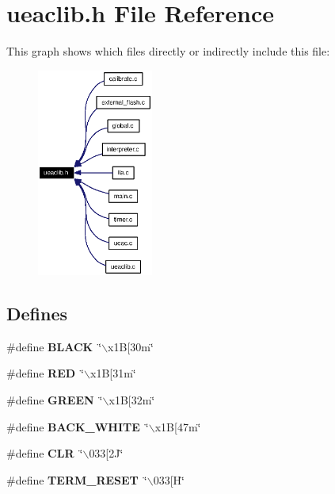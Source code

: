 \section{ueaclib.h File Reference}
\label{ueaclib_8h}


This graph shows which files directly or indirectly include this file:\begin{figure}[H]
\begin{center}
\leavevmode
\includegraphics[width=108pt]{ueaclib_8h__dep__incl}
\end{center}
\end{figure}
\subsection*{Defines}
\begin{CompactItemize}
\item 
\#define {\bf BLACK}~\char`\"{}$\backslash$x1B[30m\char`\"{}
\item 
\#define {\bf RED}~\char`\"{}$\backslash$x1B[31m\char`\"{}
\item 
\#define {\bf GREEN}~\char`\"{}$\backslash$x1B[32m\char`\"{}
\item 
\#define {\bf BACK\_\-WHITE}~\char`\"{}$\backslash$x1B[47m\char`\"{}
\item 
\#define {\bf CLR}~\char`\"{}$\backslash$033[2J\char`\"{}
\item 
\#define {\bf TERM\_\-RESET}~\char`\"{}$\backslash$033[H\char`\"{}
\end{CompactItemize}
